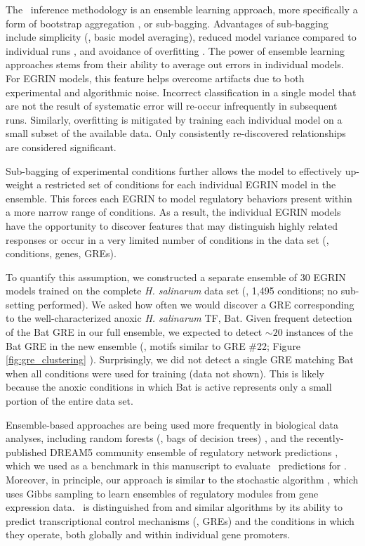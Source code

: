The \egrine~inference methodology is an ensemble learning approach,
more specifically a form of bootstrap
aggregation \cite{Breiman96baggingpredictors}, or sub-bagging.
Advantages of sub-bagging include simplicity (\ie, basic model
averaging), reduced model variance compared to individual
runs \cite{Buhlmann2002}, and avoidance of
overfitting \cite{Krogh1997}. The power of ensemble learning
approaches stems from their ability to average out errors in
individual models. For EGRIN models, this feature helps overcome
artifacts due to both experimental and algorithmic noise. Incorrect
classification in a single model that are not the result of systematic
error will re-occur infrequently in subsequent runs. Similarly,
overfitting is mitigated by training each individual model on a small
subset of the available data. Only consistently re-discovered
relationships are considered significant.

Sub-bagging of experimental conditions further allows the model to
effectively up-weight a restricted set of conditions for each
individual EGRIN model in the ensemble. This forces each EGRIN to
model regulatory behaviors present within a more narrow range of
conditions. As a result, the individual EGRIN models have the
opportunity to discover features that may distinguish highly related
responses or occur in a very limited number of conditions in the data
set (\eg, conditions, genes, GREs).

To quantify this assumption, we constructed a separate ensemble of 30
EGRIN models trained on the complete {\it H. salinarum} data set (\ie,
1,495 conditions; no sub-setting performed). We asked how often we
would discover a GRE corresponding to the well-characterized
anoxic \textit{H. salinarum} TF, Bat.  Given frequent detection of the
Bat GRE in our full ensemble, we expected to detect $\sim 20$
instances of the Bat GRE in the new ensemble (\ie, motifs similar to
GRE \#22; Figure \ref{fig:gre_clustering} \cite{Baliga2001}). Surprisingly, we
did not detect a single GRE matching Bat when all conditions were used
for training (data not shown).  This is likely because the anoxic
conditions in which Bat is active represents only a small portion of
the entire data set.

Ensemble-based approaches are being used more frequently in biological
data analyses, including random forests (\ie, bags of decision trees)
\cite{breiman2001}, and the recently-published DREAM5 community 
ensemble of regulatory network predictions \cite{Marbach2012}, which
we used as a benchmark in this manuscript to evaluate \egrine\
predictions for \eco. Moreover, in principle, our approach is similar
to the stochastic \tmsamp{LeMoNe} algorithm \cite{Joshi2009}, which
uses Gibbs sampling to learn ensembles of regulatory modules from gene
expression data. \egrine~is distinguished from \tmsamp{LeMoNe} and
similar algorithms by its ability to predict transcriptional control
mechanisms (\ie, GREs) and the conditions in which they operate, both
globally and within individual gene promoters.

